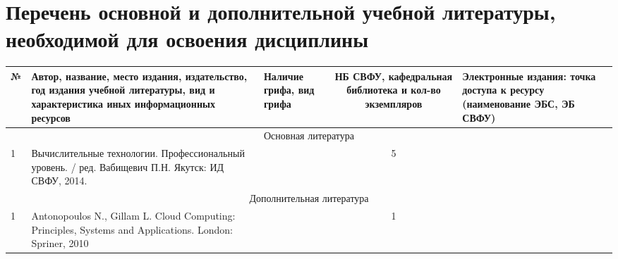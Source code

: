 \documentclass[a4paper,12pt]{article}
\begin{document}
\newpage
\section{Перечень основной и дополнительной учебной литературы, необходимой для освоения дисциплины}

  \begin{table}[H]
  \caption*{Перечень литературы}
  \begin{longtable}{|l|p{7cm}|p{18mm}|c|p{32mm}|}
  \hline
  № & 
  \centering\small\arraybackslash Автор, название, место издания, издательство, год издания учебной литературы, вид и характеристика иных информационных ресурсов &
  \multicolumn{1}{p{18mm}|}{\centering\small\arraybackslash Наличие грифа, вид грифа} &
  \multicolumn{1}{p{21mm}|}{\centering\small\arraybackslash НБ СВФУ, кафедральная библиотека и кол-во экземпляров} & 
  \centering\small\arraybackslash Электронные издания: точка доступа к ресурсу (наименование ЭБС, ЭБ СВФУ)\\
  \hline
  \multicolumn{5}{|c|}{Основная литература}\\
  \hline
  1 &\raggedright\arraybackslash Вычислительные технологии. Профессиональный уровень. / ред. Вабищевич П.Н. Якутск: ИД СВФУ, 2014.  &   &  5  &  
  \\
  \hline
  
  \multicolumn{5}{|c|}{Дополнительная литература}\\
  \hline
  1 &\raggedright\arraybackslash Antonopoulos N., Gillam L. Cloud Computing: Principles, Systems and Applications. London: Spriner, 2010  &   &  1  &  
  \\
  \hline
  
  \end{longtable}
  \end{table}
  
\thispagestyle{empty}  
\end{document}
